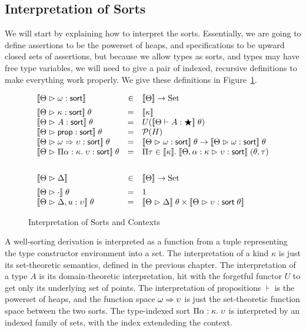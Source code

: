 \subsection{Interpretation of Sorts}

We will start by explaining how to interpret the sorts. Essentially,
we are going to define assertions to be the powerset of heaps, and
specifications to be upward closed sets of assertions, but because we
allow types as sorts, and types may have free type variables, we will
need to give a pair of indexed, recursive definitions to make
everything work properly. We give these definitions in
Figure~\ref{sort-interpretation}. 

\begin{figure}
\begin{displaymath}
  \begin{array}{lcl}
    \interp{\judgeSort{\omega}} & \in & \interp{\Theta} \to \mathrm{Set} \\[0.5em]
    \interp{\judgeSort{\kappa}} \;\theta
    & = & \interp{\kappa} 
    \\
    \interp{\judgeSort{A}}\;\theta
    & = & U(\interp{\judgeWK{A}{\bigstar}}\;\theta)
    \\
    \interp{\judgeSort{\assert}}\;\theta
    & = & \powerset{H}
    \\
    \interp{\judgeSort{\omega \To \upsilon}}\;\theta
    & = & \interp{\judgeSort{\omega}}\;\theta \to \interp{\judgeSort{\omega}}\;\theta
    \\
    \interp{\judgeSort{\forallsort{\alpha}{\kappa}{\upsilon}}}\;\theta
    & = & \Pi \tau \in \interp{\kappa}.\;\interp{\judgeSort[\Theta, \alpha:\kappa]{\upsilon}}\;(\theta,\tau)
    \\[2em]
    \interp{\judgeACtx{\Delta}} & \in & \interp{\Theta} \to \mathrm{Set} \\[0.5em]
    \interp{\judgeACtx{\cdot}}\;\theta & = & 1 \\
    \interp{\judgeACtx{\Delta, u:\upsilon}}\;\theta & = & \interp{\judgeACtx{\Delta}}\;\theta \times
                                                          \interp{\judgeSort{\upsilon}\;\theta}

  \end{array}
\end{displaymath}
\caption{Interpretation of Sorts and Contexts}
\label{sort-interpretation}  
\end{figure}

A well-sorting derivation is interpreted as a function from a tuple
representing the type constructor environment into a set. The
interpretation of a kind $\kappa$ is just its set-theoretic semantics,
defined in the previous chapter. The interpretation of a type $A$ is
its domain-theoretic interpretation, hit with the forgetful functor
$U$ to get only its underlying set of points.  The interpretation of
propositions $\assert$ is the powerset of heaps, and the function
space $\omega \Rightarrow \upsilon$ is just the set-theoretic function space
between the two sorts. The type-indexed sort
$\Pi {\alpha}:{\kappa}.\;{\upsilon}$ is interpreted by an indexed
family of sets, with the index extendeding the context.

